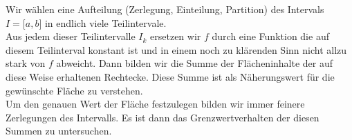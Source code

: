 \begin{enumerate}[\indent I)]
\begin{center}
\end{center}

Wir wählen eine Aufteilung (Zerlegung, Einteilung, Partition) des Intervals $I=\lbrack a,b\rbrack$ in endlich viele Teilintervale. \\

Aus jedem dieser Teilintervalle $I_k$ ersetzen wir $f$ durch eine Funktion die auf diesem Teilinterval konstant ist und in einem noch zu klärenden Sinn nicht allzu stark von $f$ abweicht. Dann bilden wir die Summe der Flächeninhalte der auf diese Weise erhaltenen Rechtecke. Diese Summe ist als Näherungswert für die gewünschte Fläche zu verstehen. \\

Um den genauen Wert der Fläche festzulegen bilden wir immer feinere Zerlegungen des Intervalls. Es ist dann das Grenzwertverhalten der diesen Summen zu untersuchen. 
\end{enumerate}
